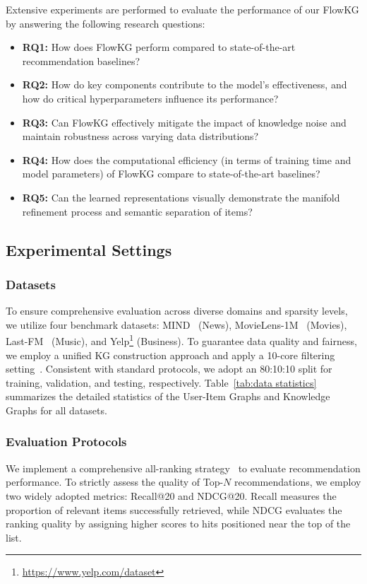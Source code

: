 

\noindent Extensive experiments are performed to evaluate the performance of our FlowKG by answering the following research questions:

\begin{itemize}
	\item \textbf{RQ1:} How does FlowKG perform compared to state-of-the-art recommendation baselines?
	\item \textbf{RQ2:} How do key components contribute to the model's effectiveness, and how do critical hyperparameters influence its performance?
	\item \textbf{RQ3:} Can FlowKG effectively mitigate the impact of knowledge noise and maintain robustness across varying data distributions?
	\item \textbf{RQ4:} How does the computational efficiency (in terms of training time and model parameters) of FlowKG compare to state-of-the-art baselines?
	\item \textbf{RQ5:} Can the learned representations visually demonstrate the manifold refinement process and semantic separation of items?
\end{itemize}

\subsection{Experimental Settings}

\subsubsection{\textbf{Datasets}}
To ensure comprehensive evaluation across diverse domains and sparsity levels, we utilize four benchmark datasets: MIND~\cite{wu2020mind} (News), MovieLens-1M~\cite{harper2015movielens} (Movies), Last-FM~\cite{cantador2011second} (Music), and Yelp\footnote{\url{https://www.yelp.com/dataset}} (Business). To guarantee data quality and fairness, we employ a unified KG construction approach and apply a 10-core filtering setting~\cite{jiang2024diffkg,li2025mask}. Consistent with standard protocols, we adopt an 80:10:10 split for training, validation, and testing, respectively. Table~\ref{tab:data statistics} summarizes the detailed statistics of the User-Item Graphs and Knowledge Graphs for all datasets.

\subsubsection{\textbf{Evaluation Protocols}}
We implement a comprehensive all-ranking strategy~\cite{ren2024representation,wang2019kgat,yang2023knowledge} to evaluate recommendation performance. To strictly assess the quality of Top-$N$ recommendations, we employ two widely adopted metrics: Recall@20 and NDCG@20. Recall measures the proportion of relevant items successfully retrieved, while NDCG evaluates the ranking quality by assigning higher scores to hits positioned near the top of the list.

